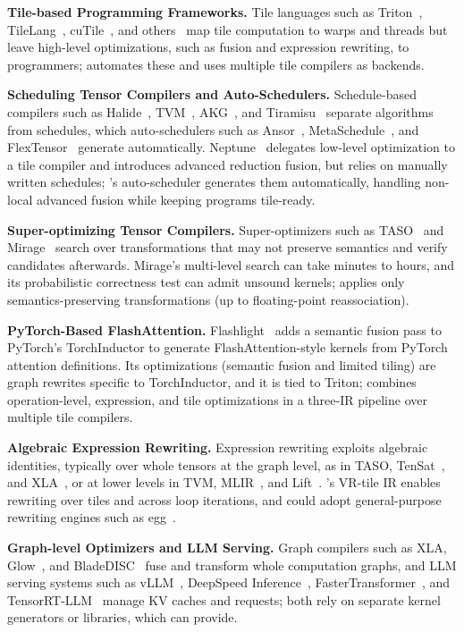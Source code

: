 \textbf{Tile-based Programming Frameworks.}
Tile languages such as Triton~\cite{triton}, TileLang~\cite{tilelang},
cuTile~\cite{cutile}, and others~\cite{cutlass,thunderkittens,tawa}
map tile computation to warps and threads but leave high-level optimizations,
such as fusion and expression rewriting, to programmers;
\NAME{} automates these and uses multiple tile compilers as backends.

\textbf{Scheduling Tensor Compilers and Auto-Schedulers.}
Schedule-based compilers such as Halide~\cite{halide}, TVM~\cite{tvm}, AKG~\cite{akg},
and Tiramisu~\cite{tiramisu} separate algorithms from schedules,
which auto-schedulers such as Ansor~\cite{ansor}, MetaSchedule~\cite{metaschedule},
and FlexTensor~\cite{flextensor} generate automatically.
Neptune~\cite{neptune} delegates low-level optimization to a tile compiler
and introduces advanced reduction fusion, but relies on manually written schedules;
\NAME{}'s auto-scheduler generates them automatically,
handling non-local advanced fusion while keeping programs tile-ready.

\textbf{Super-optimizing Tensor Compilers.}
Super-optimizers such as TASO~\cite{taso} and Mirage~\cite{mirage}
search over transformations that may not preserve semantics and verify candidates afterwards.
Mirage's multi-level search can take minutes to hours,
and its probabilistic correctness test can admit unsound kernels;
\NAME{} applies only semantics-preserving transformations
(up to floating-point reassociation).

\textbf{PyTorch-Based FlashAttention.}
Flashlight~\cite{flashlight} adds a semantic fusion pass to PyTorch's TorchInductor
to generate FlashAttention-style kernels from PyTorch attention definitions.
Its optimizations (semantic fusion and limited tiling) are graph rewrites
specific to TorchInductor, and it is tied to Triton;
\NAME{} combines operation-level, expression, and tile optimizations
in a three-IR pipeline over multiple tile compilers.

\textbf{Algebraic Expression Rewriting.}
Expression rewriting exploits algebraic identities, typically over whole tensors at the graph
level, as in TASO, TenSat~\cite{tensat}, and XLA~\cite{xla},
or at lower levels in TVM, MLIR~\cite{mlir}, and Lift~\cite{lift}.
\NAME{}'s VR-tile IR enables rewriting over tiles and across loop iterations,
and could adopt general-purpose rewriting engines such as egg~\cite{egg}.

\textbf{Graph-level Optimizers and LLM Serving.}
Graph compilers such as XLA, Glow~\cite{glow}, and BladeDISC~\cite{bladedisc}
fuse and transform whole computation graphs,
and LLM serving systems such as vLLM~\cite{vllm}, DeepSpeed Inference~\cite{deepspeed-inference},
FasterTransformer~\cite{fastertransformer}, and TensorRT-LLM~\cite{tensorrtllm}
manage KV caches and requests;
both rely on separate kernel generators or libraries, which \NAME{} can provide.

